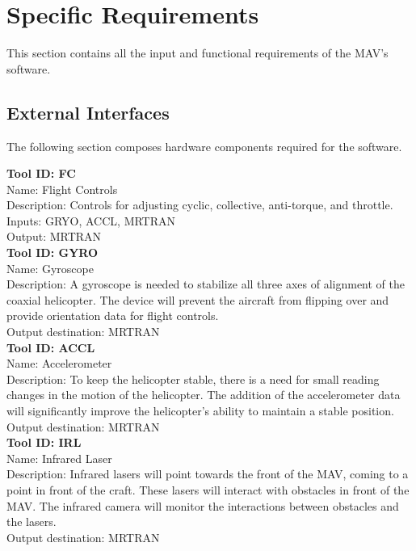 \documentclass[onecolumn, oneside, letterpaper, draftclsnofoot, 10pt, compsoc]{IEEEtran}
\begin{document}
\section{Specific Requirements}
This section contains all the input and functional requirements of the MAV's software.

\subsection{External Interfaces}
The following section composes hardware components required for the software.

\noindent
\textbf{Tool ID: FC}\\
Name: Flight Controls\\
Description: Controls for adjusting cyclic, collective, anti-torque, and throttle.\\
Inputs: GRYO, ACCL, MRTRAN\\
Output: MRTRAN\\

\noindent
\textbf{Tool ID: GYRO}\\
Name: Gyroscope\\
Description: A gyroscope is needed to stabilize all three axes of alignment of the coaxial helicopter. The device will prevent the aircraft from flipping over and provide orientation data for flight controls.\\
Output destination: MRTRAN\\

\noindent
\textbf{Tool ID: ACCL}\\
Name: Accelerometer\\
Description: To keep the helicopter stable, there is a need for small reading changes in the motion of the helicopter. The addition of the accelerometer data will significantly improve the helicopter’s ability to maintain a stable position.\\
Output destination: MRTRAN\\

\noindent
\textbf{Tool ID: IRL}\\
Name: Infrared Laser\\
Description: Infrared lasers will point towards the front of the MAV, coming to a point in front of the craft. These lasers will interact with obstacles in front of the MAV.  The infrared camera will monitor the interactions between obstacles and the lasers.\\
Output destination: MRTRAN\\
\end{document}
